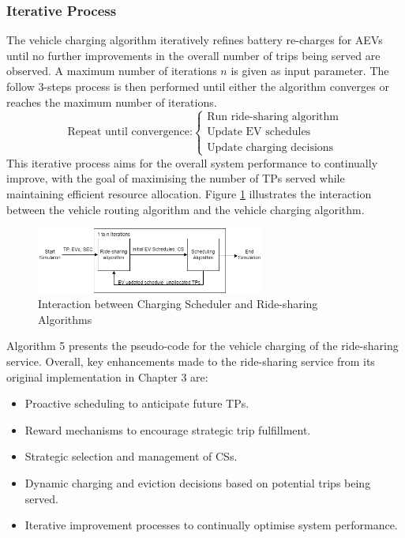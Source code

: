 \subsubsection{Iterative Process}

The vehicle charging algorithm iteratively refines battery re-charges for AEVs until no further improvements in the overall number of trips being served are observed. A maximum number of iterations \( n \) is given as input parameter. The follow 3-steps process is then performed until either the algorithm converges or reaches the maximum number of iterations.    %
\[
\text{Repeat until convergence:}
\begin{cases}
    \text{Run ride-sharing algorithm} \\
    \text{Update EV schedules} \\
    \text{Update charging decisions}
\end{cases}
\]
This iterative process aims for the overall system performance to continually improve, with the goal of maximising the number of TPs served while maintaining efficient resource allocation. Figure \ref{fig:flowchart} illustrates the interaction between the vehicle routing algorithm and the vehicle charging algorithm.
\begin{figure}[b]
  \vspace{-0.2cm}
  \centering
  \includegraphics[width=7.5cm]{Crest/Images/flowchart.png}
  \caption{Interaction between Charging Scheduler and Ride-sharing Algorithms}
  \label{fig:flowchart}
  \vspace{-0.1cm}
\end{figure}

Algorithm 5 presents the pseudo-code for the vehicle charging of the ride-sharing service. Overall, key enhancements made to the ride-sharing service from its original implementation in Chapter 3 are:
\begin{itemize}
    \item Proactive scheduling to anticipate future TPs.
    \item Reward mechanisms to encourage strategic trip fulfillment.
    \item Strategic selection and management of CSs.
    \item Dynamic charging and eviction decisions based on potential trips being served.
    \item Iterative improvement processes to continually optimise system performance.
\end{itemize}

